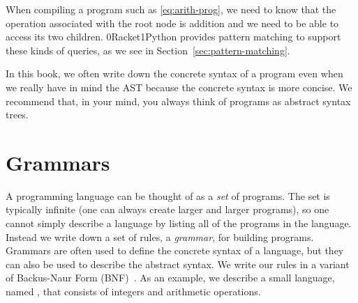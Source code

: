 \documentclass[7x10]{TimesAPriori_MIT}%
\def\racketEd{0}
\def\pythonEd{1}
\def\edition{1}
\newcommand{\racket}[1]{{\if\edition\racketEd{#1}\fi}}
\newcommand{\python}[1]{{\if\edition\pythonEd #1\fi}}
\begin{document}
When compiling a program such as \eqref{eq:arith-prog}, we need to
know that the operation associated with the root node is addition and
we need to be able to access its two children. \racket{Racket}\python{Python}
provides pattern matching to support these kinds of queries, as we see in
Section~\ref{sec:pattern-matching}.

In this book, we often write down the concrete syntax of a program
even when we really have in mind the AST because the concrete syntax
is more concise.  We recommend that, in your mind, you always think of
programs as abstract syntax trees.

\section{Grammars}
\label{sec:grammar}

A programming language can be thought of as a \emph{set} of programs.
The set is typically infinite (one can always create larger and larger
programs), so one cannot simply describe a language by listing all of
the programs in the language. Instead we write down a set of rules, a
\emph{grammar}, for building programs. Grammars are often used to
define the concrete syntax of a language, but they can also be used to
describe the abstract syntax. We write our rules in a variant of
Backus-Naur Form (BNF)~\citep{Backus:1960aa,Knuth:1964aa}.
As an example, we describe a small language, named \LangInt{}, that consists of
integers and arithmetic operations.
\end{document}

